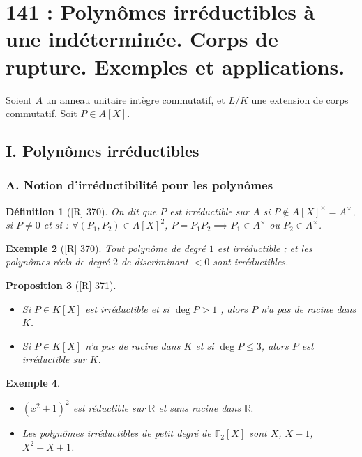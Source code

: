 \documentclass[10pt, a4paper, parskip=full, twoside, twocolumn]{report}
\newtheorem{definition}{Définition}
\newtheorem{proposition}[definition]{Proposition}
\newtheorem{example}[definition]{Exemple}
\newcommand{\IF}{\mathbb{F}}
\newcommand{\IR}{\mathbb{R}}
\begin{document}
\chapter*{141 : Polynômes irréductibles à une indéterminée. Corps de rupture. Exemples et applications.}
\setcounter{definition}{0}
\textcolor{paragraphtext}{Soient $A$ un anneau unitaire intègre commutatif, et $L/K$ une extension de corps commutatif. Soit $P\in A[X]$.}

\section*{I. Polynômes irréductibles}
\subsection*{A. Notion d'irréductibilité pour les polynômes}

\begin{definition}[\textnormal{[R] 370}]
		On dit que $P$ est \emph{irréductible sur $A$} si $P\notin A[X]^{\times} = A^{\times}$, si $P\neq 0$ et si :
		$\forall(P_1,P_2)\in A[X]^2$, $P = P_1P_2 \implies P_1\in A^{\times}$ ou $P_2\in A^{\times}$.
\end{definition}

\begin{example}[\textnormal{[R] 370}]
	Tout polynôme de degré $1$ est irréductible ; et les polynômes réels de degré $2$ de discriminant $< 0$ sont irréductibles.
\end{example}

\begin{proposition}[\textnormal{[R] 371}]
	\begin{itemize}
		\item Si $P\in K[X]$ est irréductible et si $\deg P > 1$ , alors $P$ n'a pas de racine dans $K$.
		\item Si $P\in K[X]$ n'a pas de racine dans $K$ et si $\deg P \leq 3$, alors $P$ est irréductible sur $K$.
	\end{itemize}
\end{proposition}

\begin{example}
	\begin{itemize}
		\item $(x^2+1)^2$ est réductible sur $\IR$ et sans racine dans $\IR$.
		\item Les polynômes irréductibles de petit degré de $\IF_2[X]$ sont $X$, $X+1$, $X^2+X+1$.
	\end{itemize}
\end{example}
\end{document}
